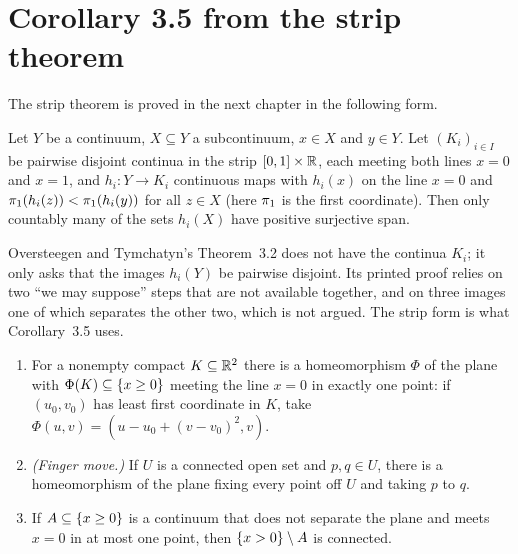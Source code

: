 \section{Corollary 3.5 from the strip theorem}

The strip theorem is proved in the next chapter in the following form.

\begin{definition}\label{def:otthm32}
Let $Y$ be a continuum, $X\subseteq Y$ a subcontinuum, $x\in X$ and $y\in Y$. Let $(K_i)_{i\in I}$ be pairwise disjoint continua in the strip
$[0,1]\times\mathbb{R}$, each meeting both lines $x=0$ and $x=1$, and $h_i\colon Y\to K_i$ continuous maps with $h_i(x)$ on the line $x=0$ and
$\pi_{1}(h_i(z))<\pi_{1}(h_i(y))$ for all $z\in X$ (here $\pi_{1}$ is the first coordinate). Then only countably many of the sets $h_i(X)$ have positive surjective
span.
\end{definition}


Oversteegen and Tymchatyn's Theorem~3.2 does not have the continua $K_i$; it only asks that the images $h_i(Y)$ be pairwise disjoint. Its printed
proof relies on two ``we may suppose'' steps that are not available together, and on three images one of which separates the other two, which is
not argued. The strip form is what Corollary~3.5 uses.

\begin{lemma}[Re-embedding]\label{lem:reembed}
\leavevmode
\begin{enumerate}[label=(E\arabic*)]
\item For a nonempty compact $K\subseteq\mathbb{R}^2$ there is a homeomorphism $\Phi$ of the plane with $\Phi(K)\subseteq\left\{ x\ge0 \right\}$ meeting the line $x=0$ in exactly one
point: if $(u_0,v_0)$ has least first coordinate in $K$, take $\Phi(u,v)=(u-u_0+(v-v_0)^2,v)$.
\item \emph{(Finger move.)} If $U$ is a connected open set and $p,q\in U$, there is a homeomorphism of the plane fixing every point off $U$ and
taking $p$ to $q$.
\item If $A\subseteq\left\{ x\ge0 \right\}$ is a continuum that does not separate the plane and meets $x=0$ in at most one point, then $\left\{ x>0 \right\}\setminus A$ is connected.
\end{enumerate}
\end{lemma}

